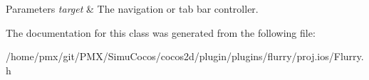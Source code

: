 \begin{DoxyParams}{Parameters}
{\em target} & The navigation or tab bar controller. \\
\hline
\end{DoxyParams}


The documentation for this class was generated from the following file\+:\begin{DoxyCompactItemize}
\item 
/home/pmx/git/\+P\+M\+X/\+Simu\+Cocos/cocos2d/plugin/plugins/flurry/proj.\+ios/Flurry.\+h\end{DoxyCompactItemize}
